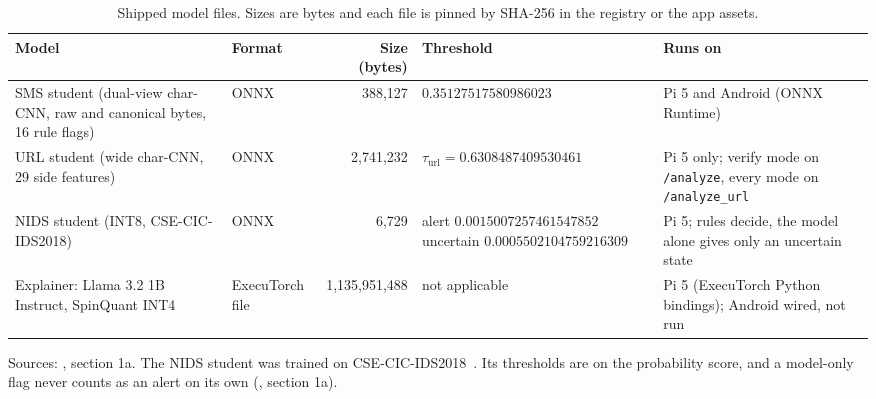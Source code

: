 \begin{table}[t]
\centering
\caption{Shipped model files. Sizes are bytes and each file is pinned by SHA-256 in the registry or the app assets.}
\label{tab:models}
\footnotesize
{\setlength{\tabcolsep}{4pt}
\begin{tabularx}{\linewidth}{Y Y r Y Y}
\toprule
Model & Format & Size (bytes) & Threshold & Runs on \\
\midrule
SMS student (dual-view char-CNN, raw and canonical bytes, 16 rule flags) & ONNX & 388,127 & $0.35127517580986023$ & Pi 5 and Android (ONNX Runtime) \\
URL student (wide char-CNN, 29 side features) & ONNX & 2,741,232 & $\tau_{\text{url}}=$\newline $0.6308487409530461$ & Pi 5 only; verify mode on \texttt{/analyze}, every mode on \texttt{/analyze\_url} \\
NIDS student (INT8, CSE-CIC-IDS2018) & ONNX & 6,729 & alert $0.0015007257461547852$\newline uncertain $0.0005502104759216309$ & Pi 5; rules decide, the model alone gives only an uncertain state \\
Explainer: Llama 3.2 1B Instruct, SpinQuant INT4 & ExecuTorch file & 1,135,951,488 & not applicable & Pi 5 (ExecuTorch Python bindings); Android wired, not run \\
\bottomrule
\end{tabularx}}
\end{table}

Sources: ,  section 1a. The NIDS student was trained on CSE-CIC-IDS2018~\cite{cicids2018}. Its thresholds are on the probability score, and a model-only flag never counts as an alert on its own (, section 1a).
